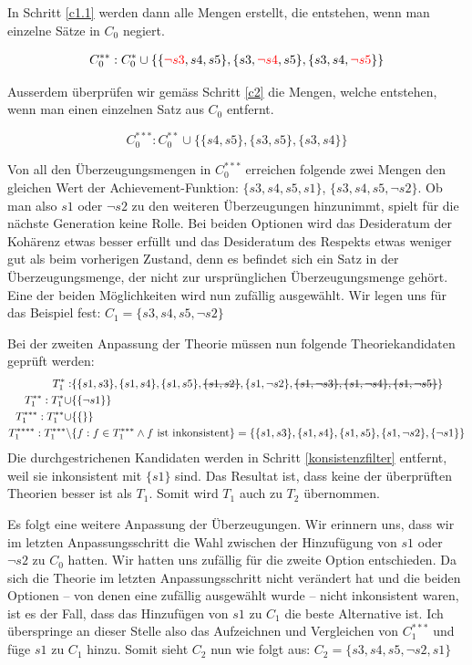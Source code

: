 \documentclass{article}
\newcommand{\stkout}[1]{\ifmmode\text{\sout{\ensuremath{#1}}}\else\sout{#1}\fi} %
\begin{document}
 In Schritt \ref{c1.1} werden dann alle Mengen erstellt, die entstehen, wenn man einzelne Sätze in $C_0$ negiert.
 
 \begin{equation} \notag
 \begin{split}
 C_0^{**}: C_0^* \cup \{\{\textcolor{red}{\neg s3}, s4, s5\}, \{s3, \textcolor{red}{\neg s4}, s5\}, \{s3, s4, \textcolor{red}{\neg s5}\}\}
 \end{split}
 \end{equation}
 
 Ausserdem überprüfen wir gemäss Schritt \ref{c2} die Mengen, welche entstehen, wenn man einen einzelnen Satz aus $C_0$ entfernt.
 
$$
    C_0^{***}: C_0^{**} \cup \{ \{s4,s5\}, \{s3,s5\}, \{s3,s4\} \}
$$
 
 Von all den Überzeugungsmengen in $C_0^{***}$ erreichen folgende zwei Mengen den gleichen Wert der Achievement-Funktion: $\{s3,s4,s5,s1\}$, $\{s3,s4,s5,\neg s2\}$. Ob man also $s1$ oder $\neg s2$ zu den weiteren Überzeugungen hinzunimmt, spielt für die nächste Generation keine Rolle. Bei beiden Optionen wird das Desideratum der Kohärenz etwas besser erfüllt und das Desideratum des Respekts etwas weniger gut als beim vorherigen Zustand, denn es befindet sich ein Satz in der Überzeugungsmenge, der nicht zur ursprünglichen Überzeugungsmenge gehört. 
Eine der beiden Möglichkeiten wird nun zufällig ausgewählt. Wir legen uns für das Beispiel fest: $C_1 = \{s3, s4, s5, \neg s2\}$
 
 Bei der zweiten Anpassung der Theorie müssen nun folgende Theoriekandidaten geprüft werden:
\begin{align}
    T_1^{*}: &\{\{s1, s3\}, \{s1, s4\}, \{s1, s5\},\stkout{\{s1, s2\}}, \{s1, \neg s2\}, \stkout{\{s1, \neg s3\}, \{s1, \neg s4\}, \{s1, \neg s5\}}\}\\
    T_1^{**}: T_1^{*} \cup &\{\{\neg s1\}\}\\
    T_1^{***}: T_1^{**} \cup &\{\{\}\}\\
    T_1^{****}: T_1^{***} \setminus &\{f : f \in T_1^{***} \land f \text{ ist inkonsistent} \} = \{\{s1, s3\}, \{s1, s4\}, \{s1, s5\}, \{s1, \neg s2\}, \{\neg s1\}\} \notag
\end{align}
Die durchgestrichenen Kandidaten werden in Schritt \ref{konsistenzfilter} entfernt, weil sie inkonsistent mit $\{s1\}$ sind.
 Das Resultat ist, dass keine der überprüften Theorien besser ist als $T_1$. Somit wird $T_1$ auch zu $T_2$ übernommen.
 
 Es folgt eine weitere Anpassung der Überzeugungen. Wir erinnern uns, dass wir im letzten Anpassungsschritt die Wahl zwischen der Hinzufügung von $s1$ oder $\neg s2$ zu $C_0$ hatten. Wir hatten uns zufällig für die zweite Option entschieden. Da sich die Theorie im letzten Anpassungsschritt nicht verändert hat und die beiden Optionen -- von denen eine zufällig ausgewählt wurde -- nicht inkonsistent waren, ist es der Fall, dass das Hinzufügen von $s1$ zu $C_1$ die beste Alternative ist. Ich überspringe an dieser Stelle also das Aufzeichnen und Vergleichen von $C_1^{***}$ und füge $s1$ zu $C_1$ hinzu. Somit sieht $C_2$ nun wie folgt aus: $C_2 = \{s3, s4, s5, \neg s2, s1\}$
 
\end{document}
